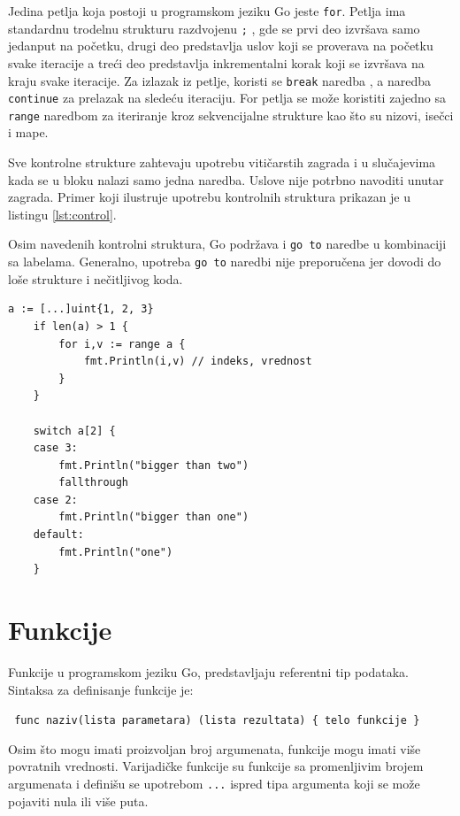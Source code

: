 \documentclass[12pt,oneside]{memoir}
\begin{document}
Jedina petlja koja postoji u programskom jeziku Go jeste \texttt{for}. Petlja ima standardnu trodelnu strukturu razdvojenu \texttt{;} , gde se prvi deo  izvršava samo jedanput na početku, drugi deo predstavlja uslov koji se proverava na početku svake iteracije a treći deo predstavlja inkrementalni korak koji se izvršava na kraju svake iteracije. Za izlazak iz petlje, koristi se \texttt{break} naredba , a naredba \texttt{continue} za prelazak na sledeću iteraciju. For petlja se može koristiti zajedno sa \texttt{range} naredbom za iteriranje kroz sekvencijalne strukture kao što su nizovi, isečci i mape. 

Sve kontrolne strukture zahtevaju upotrebu vitičarstih zagrada i u slučajevima kada se u bloku nalazi samo jedna naredba. Uslove nije potrbno navoditi unutar zagrada. Primer koji ilustruje upotrebu kontrolnih struktura prikazan je u listingu \ref{lst:control}. 

Osim navedenih kontrolni struktura, Go podržava i \texttt{go to} naredbe u kombinaciji sa labelama. Generalno, upotreba \texttt{go to} naredbi nije preporučena jer dovodi do loše strukture i nečitljivog koda.

\begin{center}
\begin{lstlisting}[caption=Primer koji demonstrira upotrebu kontrolnih struktura, label={lst:control},  backgroundcolor=\color{background}]
	a := [...]uint{1, 2, 3}
	if len(a) > 1 {
		for i,v := range a {	
			fmt.Println(i,v) // indeks, vrednost
		}
	}

	switch a[2] {
    case 3:
        fmt.Println("bigger than two")
		fallthrough
    case 2:
        fmt.Println("bigger than one")
    default:
        fmt.Println("one")
    }
\end{lstlisting}
\end{center}

\section{Funkcije} \label{func}

Funkcije u programskom jeziku Go, predstavljaju referentni tip podataka. Sintaksa za definisanje funkcije je:
\begin{center}
\texttt{ func naziv(lista parametara) (lista rezultata) \{ telo funkcije \} } 
\end{center}

 Osim što mogu imati proizvoljan broj argumenata, funkcije mogu imati više povratnih vrednosti. Varijadičke funkcije su funkcije sa promenljivim brojem argumenata i definišu se upotrebom \texttt{...} ispred tipa argumenta koji se može pojaviti nula ili više puta. 
\end{document}
